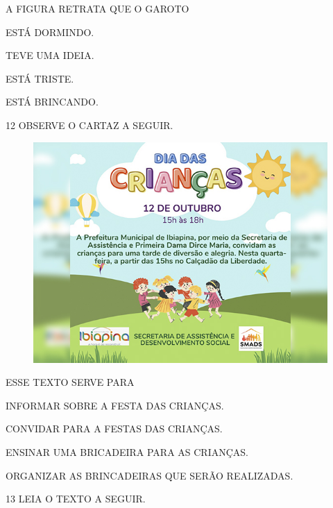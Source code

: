 A FIGURA RETRATA QUE O GAROTO

\begin{escolha}

\item ESTÁ DORMINDO.

\item TEVE UMA IDEIA.

\item ESTÁ TRISTE.

\item ESTÁ BRINCANDO.

\end{escolha}

\num{12} OBSERVE O CARTAZ A SEGUIR.

\begin{figure}[H]
\centering
\includegraphics[width=.8\textwidth]{./media/image244.jpg}
\end{figure}

ESSE TEXTO SERVE PARA

\begin{escolha}

\item INFORMAR SOBRE A FESTA DAS CRIANÇAS.

\item CONVIDAR PARA A FESTAS DAS CRIANÇAS.

\item ENSINAR UMA BRICADEIRA PARA AS CRIANÇAS.

\item ORGANIZAR AS BRINCADEIRAS QUE SERÃO REALIZADAS.

\end{escolha}

\num{13} LEIA O TEXTO A SEGUIR.

